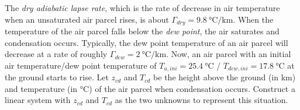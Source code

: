 \begin{Exercise}
\label{ex:lapse}
The \textit{dry adiabatic lapse rate}, which is the rate of decrease in air temperature when an unsaturated air parcel rises, is about $\Gamma_{dry} = \SI{9.8}{\celsius \per \km}$. When the temperature of the air parcel falls below the \textit{dew point}, the air saturates and condensation occurs. Typically, the dew point temperature of an air parcel will decrease at a rate of roughly $\Gamma_{dew} = \SI{2}{\celsius \per \km}$. Now, an air parcel with an initial air temperature/dew point temperature of $T_{a,ini} = \SI{25.4}{\celsius}$ / $T_{dew, ini} = \SI{17.8}{\celsius}$ at the ground starts to rise. Let $z_{cd}$ and $T_{cd}$ be the height above the ground (in \si{\km}) and temperature (in \si{\celsius}) of the air parcel when condensation occurs. Construct a linear system with $z_{cd}$ and $T_{cd}$ as the two unknowns to represent this situation.
\end{Exercise}
